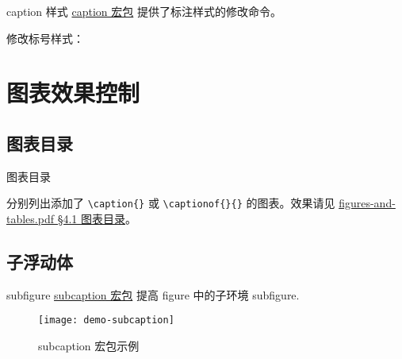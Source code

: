 \documentclass[final]{ctexbeamer}
\begin{document}
\captionsetup[figure]{name=图}

\begin{frame}[fragile]{caption 样式}
\href{http://www.ctan.org/pkg/caption}{caption 宏包} \cite{caption} 提供了标注样式的修改命令。
\begin{texlst}[numbers=none]
\usepackage{caption}
\captionsetup[figure]{name=边注图}
\end{texlst}
修改标号样式：
\begin{texlst}[numbers=none]
\renewcommand{\thefigure}{\arabic{section}.\roman{figure}}
\end{texlst}
\end{frame}



\section{图表效果控制}
\subsection{图表目录}
% 
\begin{frame}[fragile]{图表目录}
\begin{texlst}[numbers=none]
\listoffigures
\listoftables
\end{texlst}
分别列出添加了 \verb+\caption{}+ 或 \verb+\captionof{}{}+ 的图表。效果请见 \href{run:figures-and-tables.pdf#page.16}{figures-and-tables.pdf \S 4.1 图表目录}。
\end{frame}


\subsection{子浮动体}\label{sec:subfloats}
% 
\begin{frame}[fragile]{subfigure}
\href{http://www.ctan.org/pkg/subcaption}{subcaption 宏包} \cite{subcaption} 提高 figure 中的子环境 subfigure.
\end{frame}


\begin{frame}
\begin{figure}[]
  \centering
  \texttt{[image: demo-subcaption]}
  \caption{subcaption 宏包示例}
  \label{demo-subcaption}
\end{figure}
\end{frame}
\end{document}
